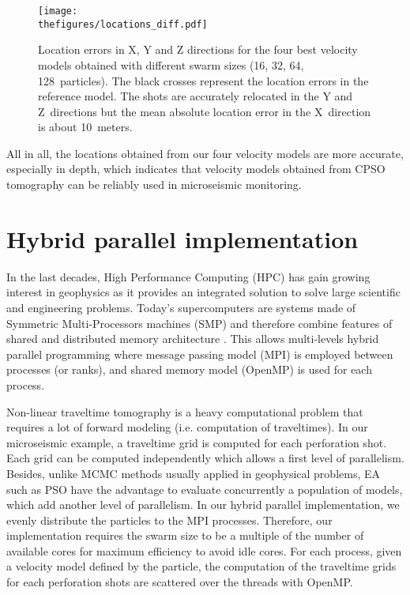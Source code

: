 \begin{figure}[!htbp]
	\centering
	\texttt{[image: \\thefigures/locations\_diff.pdf]}
	\caption{Location errors in X, Y and Z directions for the four best velocity models obtained with different swarm sizes (16, 32, 64, 128~particles). The black crosses represent the location errors in the reference model. The shots are accurately relocated in the Y and Z~directions but the mean absolute location error in the X~direction is about 10~meters.}
	\label{fig:locations_diff}
\end{figure}

All in all, the locations obtained from our four velocity models are more accurate, especially in depth, which indicates that velocity models obtained from CPSO tomography can be reliably used in microseismic monitoring. 


\section{Hybrid parallel implementation}
\label{sec:hybrid}

In the last decades, High Performance Computing (HPC) has gain growing interest in geophysics as it provides an integrated solution to solve large scientific and engineering problems. Today's supercomputers are systems made of Symmetric Multi-Processors machines (SMP) and therefore combine features of shared and distributed memory architecture \citep{Rabenseifner2009, Drosinos2004}. This allows multi-levels hybrid parallel programming where message passing model (MPI) is employed between processes (or ranks), and shared memory model (OpenMP) is used for each process.

Non-linear traveltime tomography is a heavy computational problem that requires a lot of forward modeling (i.e. computation of traveltimes). In our microseismic example, a traveltime grid is computed for each perforation shot. Each grid can be computed independently which allows a first level of parallelism. Besides, unlike MCMC methods usually applied in geophysical problems, EA such as PSO have the advantage to evaluate concurrently a population of models, which add another level of parallelism. In our hybrid parallel implementation, we evenly distribute the particles to the MPI processes. Therefore, our implementation requires the swarm size to be a multiple of the number of available {\color{\revision}cores} for maximum efficiency to avoid idle {\color{\revision}cores}. For each process, given a velocity model defined by the particle, the computation of the traveltime grids for each perforation shots are scattered over the threads with OpenMP.

